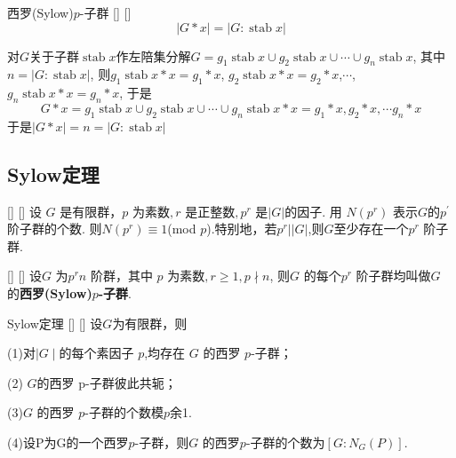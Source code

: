 \documentclass[UTF8]{ctexart}
\DeclareMathOperator{\Stab}{stab}
\begin{document}
		\begin{ppt}
            []
            {西罗(Sylow)$p$-子群}
            []
            []
			\[|G*x|=|G:\Stab x|\]
		\end{ppt}

        \begin{prf}
            对$G$关于子群$\Stab x$作左陪集分解$G=g_1\Stab x\cup g_2\Stab x\cup\cdots\cup g_n\Stab x$, 
            其中$n=|G:\Stab x|$, 则$g_1\Stab x*x={g_1*x}$, $g_2\Stab x*x={g_2*x}$,$\cdots$, 
            $g_n\Stab x*x={g_n*x}$, 于是
            \[G*x={g_1\Stab x\cup g_2\Stab x\cup\cdots\cup g_n\Stab x}*x=
            {g_1*x, g_2*x, \cdots g_n*x}\]
            于是$|G*x|=n=|G:\Stab x|$
        \end{prf}
	
	\subsection{Sylow定理}
	\begin{thm}
            []
            {}
            []
            []
	    设 $G$ 是有限群，$p$ 为素数$,r$ 是正整数$,p^r$ 是$|G|$的因子.
        用 $N(p^{r})$ 表示$G$的$p^\prime$阶子群的个数.
        则$N(p^{r})\equiv1$(mod $p$).特别地，若$p^r||G|$,则$G$至少存在一个$p^{r}$ 阶子群.
	\end{thm}

        \begin{prf}
        
        \end{prf}

        \begin{dfn}
            []
            {}
            []
            []
        设$G$ 为$p^r n$ 阶群，其中 $p$ 为素数$,r\geqslant1,p\nmid n$,
        则$G$ 的每个$p^r$ 阶子群均叫做$G$ 的\textbf{西罗(Sylow)$p$-子群}.
       \end{dfn}

        \begin{thm}
            []
            {Sylow定理}
            []
            []
            设$G$为有限群，则
            
            (1)对$\mid G\mid$的每个素因子 $p$,均存在 $G$ 的西罗 $p$-子群；
            
            (2) $G$的西罗 p-子群彼此共轭；
            
            (3)$G$ 的西罗 $p$-子群的个数模$p$余1.
            
            (4)设P为G的一个西罗$p$-子群，则$G$ 的西罗$p$-子群的个数为$[G:N_G(P)].$
        \end{thm}
            
\end{document}
